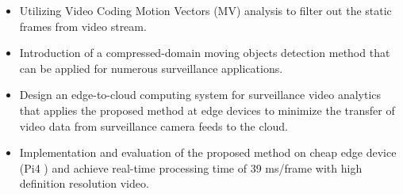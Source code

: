 \begin{itemize}
\item Utilizing Video Coding Motion Vectors (MV) analysis to filter out the static frames from video stream.
\item Introduction of a compressed-domain moving objects detection method that can be applied for numerous surveillance applications.
\item Design an edge-to-cloud computing system for surveillance video analytics that applies the proposed method at edge devices to minimize the transfer of video data from surveillance camera feeds to the cloud.
\item Implementation and evaluation of the proposed method on cheap edge device (Pi4 ) and achieve real-time processing time of  39 ms/frame with high definition resolution video.
\end{itemize}
%
%
